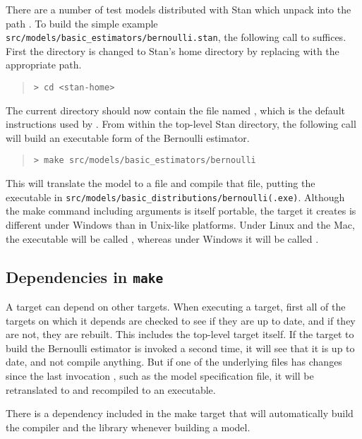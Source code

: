 There are a number of test models distributed with Stan which unpack
into the path .  To build the simple example
\nolinkurl{src/models/basic\_estimators/bernoulli.stan}, the following call
to  suffices.  First the directory is changed to Stan's home
directory by replacing  with the appropriate path.
%
\begin{quote}
\begin{Verbatim}[fontshape=sl]
> cd <stan-home>
\end{Verbatim}
\end{quote}
%
The current directory should now contain the file named
, which is the default instructions used by
.  From within the top-level Stan directory, the following call
will build an executable form of the Bernoulli estimator.
%
\begin{quote}
\begin{Verbatim}[fontshape=sl]
> make src/models/basic_estimators/bernoulli
\end{Verbatim}
\end{quote}
%
This will translate the model  to a \Cpp file and
compile that \Cpp file, putting the executable in
\nolinkurl{src/models/basic_distributions/bernoulli(.exe)}.  Although
the make command including arguments is itself portable, the target it
creates is different under Windows than in Unix-like platforms.  Under
Linux and the Mac, the executable will be called ,
whereas under Windows it will be called .

\subsection{Dependencies in {\tt\bfseries make}}

A  target can depend on other  targets.  When
executing a  target, first all of the targets on which it
depends are checked to see if they are up to date, and if they are
not, they are rebuilt.  This includes the top-level target itself.  If
the  target to build the Bernoulli estimator is invoked a
second time, it will see that it is up to date, and not compile
anything.  But if one of the underlying files has changes since the
last invocation , such as the model specification file, it
will be retranslated to \Cpp and recompiled to an executable.

There is a dependency included in the make target that will
automatically build the  compiler and the
 library whenever building a model.


